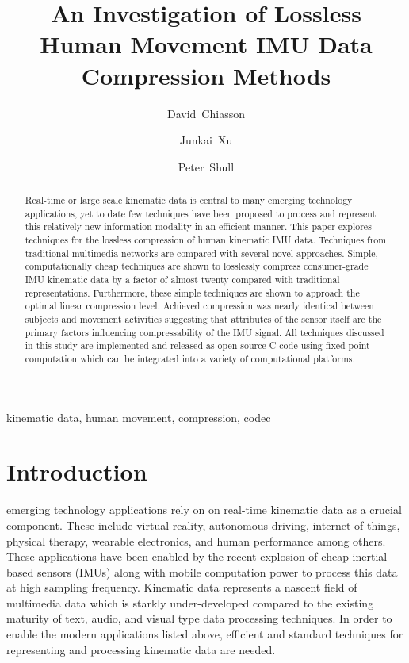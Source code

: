 \documentclass[journal]{IEEEtran}
\begin{document}
\title{An Investigation of Lossless Human Movement IMU Data Compression Methods}

\author[1]{David~Chiasson}
\author[1]{Junkai~Xu}
\author[1]{Peter~Shull}

\maketitle

\begin{abstract}
Real-time or large scale kinematic data is central to many emerging technology applications, yet to date few techniques have been proposed to process and represent this relatively new information modality in an efficient manner. This paper explores techniques for the lossless compression of human kinematic IMU data. Techniques from traditional multimedia networks are compared with several novel approaches. Simple, computationally cheap techniques are shown to losslessly compress consumer-grade IMU kinematic data by a factor of almost twenty compared with traditional representations. Furthermore, these simple techniques are shown to approach the optimal linear compression level. Achieved compression was nearly identical between subjects and movement activities suggesting that attributes of the sensor itself are the primary factors influencing compressability of the IMU signal.
All techniques discussed in this study are implemented and released as open source C code using fixed point computation which can be integrated into a variety of computational platforms. 
\end{abstract}

\begin{IEEEkeywords}
kinematic data, human movement, compression, codec
\end{IEEEkeywords}



\section{Introduction}

 emerging technology applications rely on on real-time kinematic data as a crucial component. These include virtual reality, autonomous driving, internet of things, physical therapy, wearable electronics, and human performance among others. These applications have been enabled by the recent explosion of cheap inertial based sensors (IMUs) along with mobile computation power to process this data at high sampling frequency. Kinematic data represents a nascent field of multimedia data which is starkly under-developed compared to the existing maturity of text, audio, and visual type data processing techniques. In order to enable the modern applications listed above, efficient and standard techniques for representing and processing kinematic data are needed.
\end{document}
